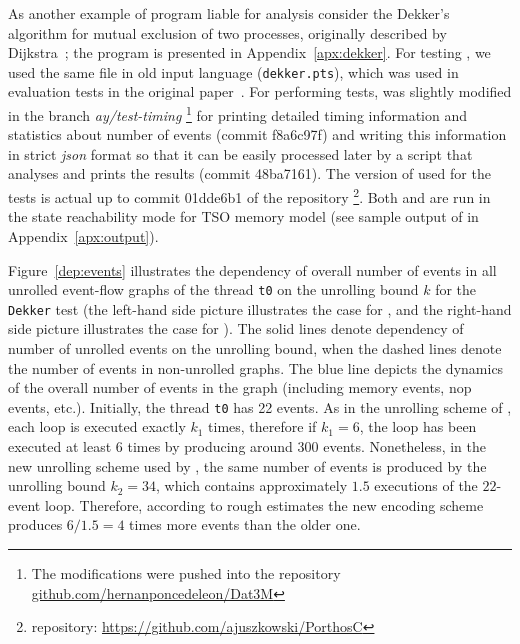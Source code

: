 As another example of program liable for analysis consider the Dekker's algorithm for mutual exclusion of two processes, originally described by Dijkstra~\cite{dijkstra1962over}; the program is presented in Appendix~\ref{apx:dekker}.
For testing \porthos[1], we used the same file in old \porthos{} input language (\texttt{dekker.pts}), which was used in evaluation tests in the original paper~\cite{Porthos17a}.
For performing tests, \porthos[2] was slightly modified in the branch \textit{ay/test-timing}%
\footnote{The modifications were pushed into the \porthos[1] repository \url{github.com/hernanponcedeleon/Dat3M}} %
%
for printing detailed timing information and statistics about number of events (commit f8a6c97f) and writing this information in strict \textit{json} format so that it can be easily processed later by a script that analyses and prints the results (commit 48ba7161).
The version of \porthos[2] used for the tests is actual up to commit 01dde6b1 of the \porthos[2] repository%
\footnote{\porthos[2] repository: \url{https://github.com/ajuszkowski/PorthosC}}. %
%
Both \porthos[1] and \porthos[2] are run in the state reachability mode for TSO memory model (see sample output of \porthos[2] in Appendix~\ref{apx:output}).

Figure~\ref{dep:events} illustrates the dependency of overall number of events in all unrolled event-flow graphs of the thread \texttt{t0} on the unrolling bound $k$ for the \texttt{Dekker} test (the left-hand side picture illustrates the case for \porthos[2], and the right-hand side picture illustrates the case for \porthos{}).
The solid lines denote dependency of number of unrolled events on the unrolling bound, when the dashed lines denote the number of events in non-unrolled graphs.
The blue line depicts the dynamics of the overall number of events in the graph (including memory events, nop events, etc.).
Initially, the thread \texttt{t0} has 22 events.
As in the unrolling scheme of \porthos[1], each loop is executed exactly $k_1$ times, therefore if $k_1=6$, the loop has been executed at least 6 times by producing around $300$ events.
Nonetheless, in the new unrolling scheme used by \porthos[2], the same number of events is produced by the unrolling bound $k_2=34$, which contains approximately $1.5$ executions of the $22$-event loop.
Therefore, according to rough estimates the new encoding scheme produces $6/1.5=4$ times more events than the older one.

